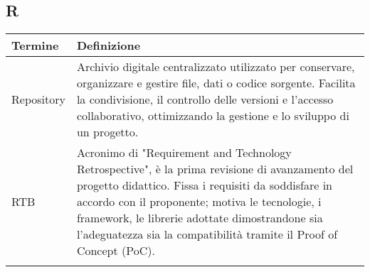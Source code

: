 \documentclass[10pt]{article}
\begin{document}
\subsection{R} %
\begin{tabularx}{\textwidth}{|>{\centering\arraybackslash}l|X|}
\hline
\rowcolor[gray]{0.8}
\textbf{Termine} & \textbf{Definizione}\\
\hline
Repository & Archivio digitale centralizzato utilizzato per conservare, organizzare e gestire file, dati o codice sorgente. Facilita la condivisione, il controllo delle versioni e l'accesso collaborativo, ottimizzando la gestione e lo sviluppo di un progetto.\\
\hline
RTB & Acronimo di "Requirement and Technology Retrospective", è la prima revisione di avanzamento del progetto didattico. Fissa i requisiti da soddisfare in accordo con il proponente; motiva le tecnologie, i framework, le librerie adottate dimostrandone sia l'adeguatezza sia la compatibilità tramite il Proof of Concept (PoC).\\
\hline
& \\
\hline
\end{tabularx}
\end{document}

